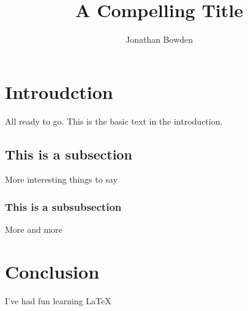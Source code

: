 \documentclass{article}
\title{A Compelling Title}
\author{Jonathan Bowden}
\begin{document}
\maketitle

\section{Introudction}

All ready to go. This is the basic text in the introduction.

\subsection{This is a subsection}

More interesting things to say

\subsubsection{This is a subsubsection}

More and more

\section{Conclusion}

I've had fun learning \LaTeX
\end{document}
